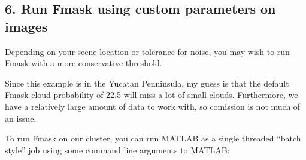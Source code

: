 \documentclass{article}
\begin{document}
    \subsection{6. Run Fmask using custom parameters on
images}\label{run-fmask-using-custom-parameters-on-images}

Depending on your scene location or tolerance for noise, you may wish to
run Fmask with a more conservative threshold.

Since this example is in the Yucatan Penninsula, my guess is that the
default Fmask cloud probability of 22.5 will miss a lot of small clouds.
Furthermore, we have a relatively large amount of data to work with, so
comission is not much of an issue.

To run Fmask on our cluster, you can run MATLAB as a single threaded
``batch style'' job using some command line arguments to MATLAB:
\end{document}
